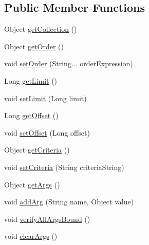 \subsection*{Public Member Functions}
\begin{DoxyCompactItemize}
\item 
Object \mbox{\hyperlink{interfacecom_1_1mysql_1_1cj_1_1xdevapi_1_1_find_params_af4736fac267c3b5061fc61754ea8c9fe}{get\+Collection}} ()
\item 
Object \mbox{\hyperlink{interfacecom_1_1mysql_1_1cj_1_1xdevapi_1_1_find_params_a0ba50993d7e67f11e1bc4d3a92635a4f}{get\+Order}} ()
\item 
void \mbox{\hyperlink{interfacecom_1_1mysql_1_1cj_1_1xdevapi_1_1_find_params_ad7efa7cf04f9f7675d0f91c96a565704}{set\+Order}} (String... order\+Expression)
\item 
Long \mbox{\hyperlink{interfacecom_1_1mysql_1_1cj_1_1xdevapi_1_1_find_params_ae56366ca314647fad35f9417bf08de1d}{get\+Limit}} ()
\item 
void \mbox{\hyperlink{interfacecom_1_1mysql_1_1cj_1_1xdevapi_1_1_find_params_a00f6b509413147a00390b44ca06f2197}{set\+Limit}} (Long limit)
\item 
Long \mbox{\hyperlink{interfacecom_1_1mysql_1_1cj_1_1xdevapi_1_1_find_params_a999fb78d26913dc6403ca9863b1b4670}{get\+Offset}} ()
\item 
void \mbox{\hyperlink{interfacecom_1_1mysql_1_1cj_1_1xdevapi_1_1_find_params_ae6d56a9a12a24481232ca5dadd26d60b}{set\+Offset}} (Long offset)
\item 
Object \mbox{\hyperlink{interfacecom_1_1mysql_1_1cj_1_1xdevapi_1_1_find_params_ad8156e94ab6e273a66b08240843cb12a}{get\+Criteria}} ()
\item 
void \mbox{\hyperlink{interfacecom_1_1mysql_1_1cj_1_1xdevapi_1_1_find_params_a2d60a8c39a0b533be609e3755eb43dd1}{set\+Criteria}} (String criteria\+String)
\item 
Object \mbox{\hyperlink{interfacecom_1_1mysql_1_1cj_1_1xdevapi_1_1_find_params_a4d894c7208eadbd63b57034af08dc14d}{get\+Args}} ()
\item 
void \mbox{\hyperlink{interfacecom_1_1mysql_1_1cj_1_1xdevapi_1_1_find_params_acfde0b00091fcfdf4728c009f39c9951}{add\+Arg}} (String name, Object value)
\item 
void \mbox{\hyperlink{interfacecom_1_1mysql_1_1cj_1_1xdevapi_1_1_find_params_a6837b83b1e100693a2db78f719f37f3c}{verify\+All\+Args\+Bound}} ()
\item 
void \mbox{\hyperlink{interfacecom_1_1mysql_1_1cj_1_1xdevapi_1_1_find_params_a51b9b985efd1cd328f3c226b396022e7}{clear\+Args}} ()

\end{DoxyCompactItemize}
